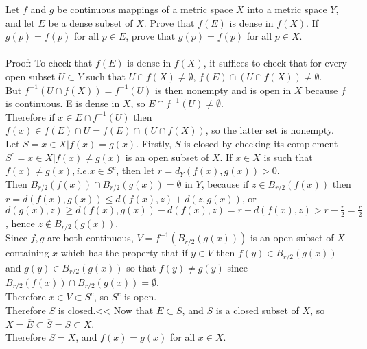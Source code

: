 \documentclass [12pt,letterpaper]{exam}
\begin{document}
\begin{questions}
\question Let $f$ and $g$ be continuous mappings of a metric space
$X$ into a metric space $Y$, and let $E$ be a dense subset of $X$.
Prove that $f(E)$ is dense in $f(X)$. If $g(p)=f(p)$ for all $p \in
E$, prove that $g(p)=f(p)$ for all $p \in X$.\\\\
Proof: To check that $f(E)$ is dense in $f(X)$, it suffices to check that for every open subset $U \subset Y$ such that $U \cap f(X) \neq \emptyset$, $f(E) \cap (U \cap f(X)) \neq \emptyset$. \\
But $f^{-1}(U \cap f(X)) = f^{-1}(U)$ is then nonempty and is open in $X$ because $f$ is continuous. E is dense in $X$, so $E \cap f^{-1}(U) \neq \emptyset$.\\
Therefore if $x \in E \cap f^{-1}(U)$ then $f(x) \in f(E) \cap U = f(E) \cap (U \cap f(X))$, so the latter set is nonempty.\\
Let $S = {x \in X | f(x) = g(x)}$. Firstly, $S$ is closed by checking its complement $S^c = {x \in X | f(x) \neq g(x)}$ is an open subset of $X$. If $x \in X$ is such that $f(x) \neq g(x), i.e. x \in S^c$, then let $r = d_Y(f(x),g(x)) > 0$.\\
Then $B_{r/2}(f(x)) \cap B_{r/2}(g(x)) = \emptyset$ in $Y$, because if $z \in B_{r/2}(f(x))$ then $r = d(f(x),g(x)) \leq d(f(x),z) + d(z,g(x))$, or $d(g(x),z) \geq d(f(x),g(x)) - d(f(x),z) = r - d(f(x),z) > r-\frac{r}{2} = \frac{r}{2}$, hence $z \notin B_{r/2}(g(x))$.\\
Since $f,g$ are both continuous, $V = f^{-1}(B_{r/2}(g(x)))$ is an open subset of $X$ containing $x$ which has the property that if $y \in V$ then $f(y) \in B_{r/2}(g(x))$ and $g(y) \in B_{r/2}(g(x))$ so that $f(y) \neq g(y)$ since $B_{r/2}(f(x)) \cap B_{r/2}(g(x)) = \emptyset$.\\
Therefore $x \in V \subset S^c$, so $S^c$ is open. \\
Therefore $S$ is closed.<<
Now that $E \subset S$, and $S$ is a closed subset of $X$, so $X = \overline{E} \subset \overline{S} = S \subset X$.\\
Therefore $S = X$, and $f(x) = g(x)$ for all $x \in X$.\\



\end{questions}
\end{document}
